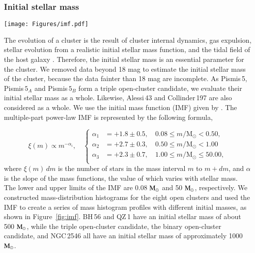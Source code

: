 \documentclass{aa} %
\begin{document}
\subsubsection{Initial stellar mass} \label{sec:imf}
\begin{figure*}%
    \centering
    \texttt{[image: Figures/imf.pdf]}
    \caption{~ Initial stellar mass estimation of the aggregate candidate Pismis\,5, 
    Pismis$\,5_{A}$, and  Pismis$\,5_{B}$, (a); QZ\,1 (b), the aggregate candidate composed of Alessi\,43 and 
    Collinder\,197; (c) BH\,56 (d); and NGC\,2546 (e) based on the IMF model \citep{2001MNRAS.322..231K}. 
    The histograms, which are fitted with IMFs of varied total mass, show the observed mass 
    distribution.}
    \label{fig:imf}
    \end{figure*}



The evolution of a cluster is the result of cluster internal dynamics, gas expulsion, stellar 
evolution from a realistic initial stellar mass function, and the tidal field of the host 
galaxy \citep{2022A&A...660A..61D}. Therefore, the initial stellar mass is an essential parameter
for the cluster. We removed data beyond 18 mag to estimate the initial stellar mass of the cluster, because the data fainter than 18 mag are incomplete. As 
Pismis\,5, Pismis$\,5_{A}$ and Pismis$\,5_{B}$ form a triple open-cluster candidate, we evaluate their initial 
stellar mass as a whole. Likewise, Alessi\,43 and Collinder\,197 are also considered as a whole. 
We use the initial mass function (IMF) given by \citet{2001MNRAS.322..231K}. The multiple-part power-law IMF is represented by the following formula,

\begin{equation}
    \xi(m) \propto m^{-\alpha_{i}}, 
    \quad \left\{
    \begin{aligned}
    \alpha_{1} &=+1.8 \pm 0.5, \quad 0.08 \leq m / \mathrm{M}_{\odot}<0.50,\\
    \alpha_{2} &=+2.7 \pm 0.3, \quad 0.50 \leq m / \mathrm{M}_{\odot}< 1.00\\
    \alpha_{3} &=+2.3 \pm 0.7, \quad 1.00 \leq m / \mathrm{M}_{\odot}\le50.00, \\
    \end{aligned}
    \right.
    \end{equation}
where $\xi(m)\,dm$ is the number of stars in the mass interval $m$ to $m+dm$, and ${\alpha}$ is the slope 
of the mass functions, the value of which varies with stellar mass.
The lower and upper limits of the IMF are 0.08 $\rm M_{\odot}$ and 50 $\rm M_{\odot}$, respectively.
We constructed mass-distribution histograms for the eight open clusters and used the IMF to create a series of mass histogram profiles with different initial masses, as shown in Figure~\ref{fig:imf}.
BH\,56 and QZ\,1 have an initial stellar mass of about 500 $\rm M_{\odot}$, while the triple open-cluster candidate, the binary open-cluster candidate, and NGC\,2546 all have an initial stellar mass of approximately 1000 $\rm M_{\odot}$.
\end{document}
